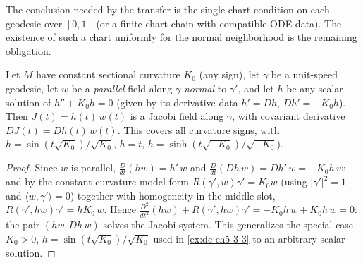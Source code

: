 \begin{lemma}
  \label{lem:dc-ch8-2-1-single-chart}


  The conclusion needed by the transfer is the single-chart condition on each geodesic over
  $[0,1]$ (or a finite chart-chain with compatible ODE data). The existence of such a chart
  uniformly for the normal neighborhood is the remaining obligation.
\end{lemma}

\begin{lemma}
  \label{lem:dc-ch8-2-1-jacobi-const-solution}


  Let $M$ have constant sectional curvature $K_0$ (any sign), let $\gamma$ be a
  unit-speed geodesic, let $w$ be a \emph{parallel} field along $\gamma$ \emph{normal}
  to $\gamma'$, and let $h$ be any scalar solution of $h''+K_0 h=0$ (given by its
  derivative data $h'=Dh$, $Dh'=-K_0 h$). Then $J(t)=h(t)\,w(t)$ is a Jacobi field
  along $\gamma$, with covariant derivative $DJ(t)=Dh(t)\,w(t)$. This covers
  all curvature signs, with
  $h=\sin(t\sqrt{K_0})/\sqrt{K_0}$, $h=t$, $h=\sinh(t\sqrt{-K_0})/\sqrt{-K_0}$).
\end{lemma}
\begin{proof}

\sketch
  Since $w$ is parallel, $\tfrac{D}{dt}(h w)=h'\,w$ and
  $\tfrac{D}{dt}(Dh\,w)=Dh'\,w=-K_0 h\,w$; and by the constant-curvature model form
  $R(\gamma',w)\gamma'=K_0 w$ (using $|\gamma'|^2=1$ and
  $\langle w,\gamma'\rangle=0$) together with homogeneity in the middle slot,
  $R(\gamma',h w)\gamma'=h K_0\,w$. Hence
  $\tfrac{D^2}{dt^2}(h w)+R(\gamma',h w)\gamma'=-K_0 h\,w+K_0 h\,w=0$: the pair
  $(h w, Dh\,w)$ solves the Jacobi system. This generalizes the special case
  $K_0>0$, $h=\sin(t\sqrt{K_0})/\sqrt{K_0}$ used in
  \cref{ex:dc-ch5-3-3} to an arbitrary scalar solution.
\end{proof}

